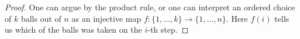 

\setcounter{section}{2}
\setcounter{subsection}{4}
\setcounter{dfn}{10}

\begin{proof}
One can argue by the product rule, or one can interpret an ordered choice of $k$ balls out of $n$ as an injective map $f \colon \{1, \ldots, k\} \to \{1, \ldots, n\}$.
Here $f(i)$ tells us which of the balls was taken on the $i$-th step.
\end{proof}




